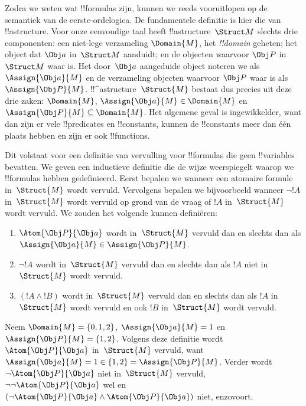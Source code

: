\documentclass[../../../include/open-logic-section]{subfiles}
\begin{document}


Zodra we weten wat !!{formula}s zijn, kunnen we reeds vooruitlopen op
de semantiek van de eerste-ordelogica. De fundamentele definitie is
hier die van !!a{structure}. Voor onze eenvoudige taal heeft
!!a{structure}~$\Struct M$ slechts drie componenten: een niet-lege
verzameling $\Domain{M}$, het \emph{!!{domain}} geheten; het object dat
$\Obj a$ in~$\Struct M$ aanduidt; en de objecten waarvoor $\Obj P$ in
$\Struct M$ waar is. Het door~$\Obj a$ aangeduide object noteren we als
$\Assign{\Obj a}{M}$ en de verzameling objecten waarvoor $\Obj P$ waar
is als~$\Assign{\Obj P}{M}$. !!^a{structure}~$\Struct{M}$ bestaat dus
precies uit deze drie zaken: $\Domain{M}$,
$\Assign{\Obj a}{M} \in \Domain{M}$ en
$\Assign{\Obj P}{M} \subseteq \Domain{M}$. Het algemene geval is
ingewikkelder, want dan zijn er vele !!{predicate}s en !!{constant}s,
kunnen de !!{constant}s meer dan één plaats hebben en zijn er ook
!!{function}s.

Dit volstaat voor een definitie van vervulling voor !!{formula}s die
geen !!{variable}s bevatten. We geven een inductieve definitie die de
wijze weerspiegelt waarop we !!{formula}s hebben gedefinieerd. Eerst
bepalen we wanneer een atomaire formule in~$\Struct{M}$ wordt vervuld.
Vervolgens bepalen we bijvoorbeeld wanneer $\lnot !A$ in~$\Struct{M}$
wordt vervuld op grond van de vraag of $!A$ in~$\Struct{M}$ wordt
vervuld. We zouden het volgende kunnen definiëren:
\begin{enumerate}
  \item $\Atom{\Obj P}{\Obj a}$ wordt in~$\Struct{M}$ vervuld dan en slechts dan als
  $\Assign{\Obj a}{M} \in \Assign{\Obj P}{M}$.
  \item $\lnot !A$ wordt in~$\Struct{M}$ vervuld dan en slechts dan als $!A$ niet
  in~$\Struct{M}$ wordt vervuld.
  \item $(!A \land !B)$ wordt in~$\Struct{M}$ vervuld dan en slechts dan als $!A$
  in~$\Struct{M}$ wordt vervuld en ook $!B$ in~$\Struct{M}$ wordt vervuld.
\end{enumerate}
Neem $\Domain{M} = \{0, 1, 2\}$, $\Assign{\Obj a}{M} = 1$ en
$\Assign{\Obj P}{M} = \{1, 2\}$. Volgens deze definitie wordt
$\Atom{\Obj P}{\Obj a}$ in~$\Struct{M}$ vervuld, want
$\Assign{\Obj a}{M} =  1 \in \{1,2\} = \Assign{\Obj P}{M}$. Verder
wordt $\lnot \Atom{\Obj P}{\Obj a}$ niet in~$\Struct{M}$ vervuld,
$\lnot\lnot \Atom{\Obj P}{\Obj a}$ wel en
$(\lnot \Atom{\Obj P}{\Obj a} \land \Atom{\Obj P}{\Obj a})$ niet,
enzovoort.
\end{document}

